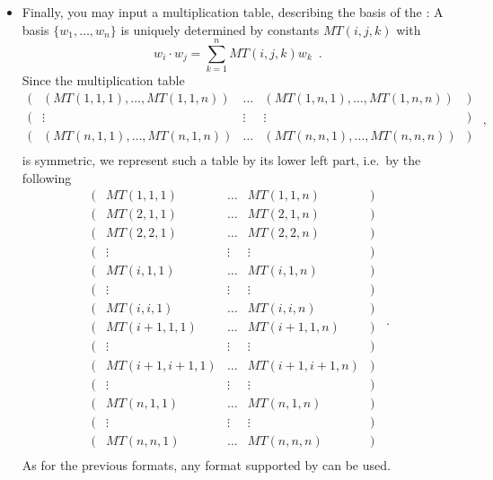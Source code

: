 \begin{itemize}
\item Finally, you may input a multiplication table, describing the basis of the
  : A basis $\{ w_1, \dots, w_n \}$ is uniquely determined by constants
  $MT(i,j,k)$ with
  \begin{displaymath}
    w_i \cdot w_j=\sum_{k=1}^{n} MT(i,j,k) w_k \enspace.
  \end{displaymath}
  Since the multiplication table
  \begin{displaymath}
    \begin{array}{ccccc}
      (& (MT(1,1,1),\dots,MT(1,1,n)) & \dots & (MT(1,n,1),\dots,MT(1,n,n))&)\\
      (& \vdots & \vdots & \vdots &)\\
      (& (MT(n,1,1),\dots,MT(n,1,n)) & \dots & (MT(n,n,1),\dots,MT(n,n,n))&)\\
    \end{array}\enspace,
  \end{displaymath}
  is symmetric, we represent such a table by its lower left part, i.e.~by the following
  \begin{displaymath}
    \begin{array}{ccccc}
      (& MT(1,1,1) & \dots & MT(1,1,n)&)\\
      (& MT(2,1,1) & \dots & MT(2,1,n)&)\\
      (& MT(2,2,1) & \dots & MT(2,2,n)&)\\
      (& \vdots & \vdots & \vdots &)\\
      (& MT(i,1,1) & \dots & MT(i,1,n)&)\\
      (& \vdots & \vdots & \vdots &)\\
      (& MT(i,i,1) & \dots & MT(i,i,n)&)\\
      (& MT(i+1,1,1) & \dots & MT(i+1,1,n)&)\\
      (& \vdots & \vdots & \vdots &)\\
      (& MT(i+1,i+1,1) & \dots & MT(i+1,i+1,n)&)\\
      (& \vdots & \vdots & \vdots &)\\
      (& MT(n,1,1) & \dots & MT(n,1,n)&)\\
      (& \vdots & \vdots & \vdots &)\\
      (& MT(n,n,1) & \dots & MT(n,n,n)&)\\
    \end{array}\enspace.
  \end{displaymath}
  As for the previous formats, any format supported by  can be used.
\end{itemize}

